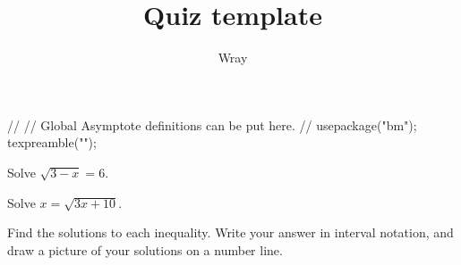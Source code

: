 \documentclass[addpoints, 12pt]{exam}
\title{Quiz template}
\author{Wray}
\begin{document}
\begin{asydef}
//
// Global Asymptote definitions can be put here.
//
usepackage("bm");
texpreamble("\def\V#1{\bm{#1}}");
\end{asydef}



\bigskip

             
\bigskip
\bigskip

\smallskip

\begin{questions}

\question[3]
Solve $\sqrt{3-x} = 6$.


\question[5]
Solve $x = \sqrt{3x + 10}$.


\newpage

\question
Find the solutions to each inequality.  Write your answer in interval notation, and draw a picture of your solutions on a number line.


\end{questions}
\end{document}
